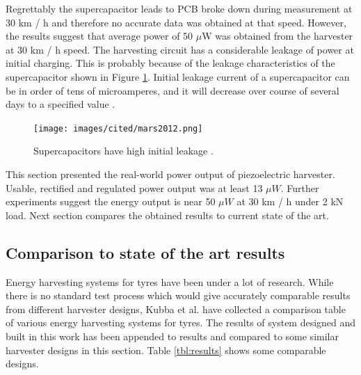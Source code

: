 Regrettably the supercapacitor leads to PCB broke down during measurement at 30 km / h and therefore no accurate data was obtained at that speed. However, the results suggest that average power of 50 $\mu$W was obtained from the harvester at 30 km / h speed. The harvesting circuit has a considerable leakage of power at initial charging. This is probably because of the leakage characteristics of the supercapacitor shown in Figure \ref{fig:scap_leakage}. Initial leakage current of a supercapacitor can be in order of tens of microamperes, and it will decrease over course of several days to a specified value \cite{Mars2012}.

\begin{figure}[htb]
\begin{center}
\texttt{[image: images/cited/mars2012.png]}
\end{center}
\caption{\label{fig:scap_leakage} Supercapacitors have high initial leakage \cite{Mars2012}.}
\end{figure}

This section presented the real-world power output of piezoelectric harvester. Usable, rectified and regulated power output was at least 13 $\mu W$. Further experiments suggest the energy output is near 50 $\mu W$ at 30 km / h under 2 kN load. Next section compares the obtained results to current state of the art.

\subsection{Comparison to state of the art results}\label{sect:state-of-art}
Energy harvesting systems for tyres have been under a lot of research. While there is no standard test process which would give accurately comparable results from different harvester designs, Kubba et al. \cite{Kubba2014} have 
collected a comparison table of various energy harvesting systems for tyres. The results of system designed and built in this work has been appended to results and compared to some similar harvester designs in this section. Table \ref{tbl:results} shows some comparable designs.

